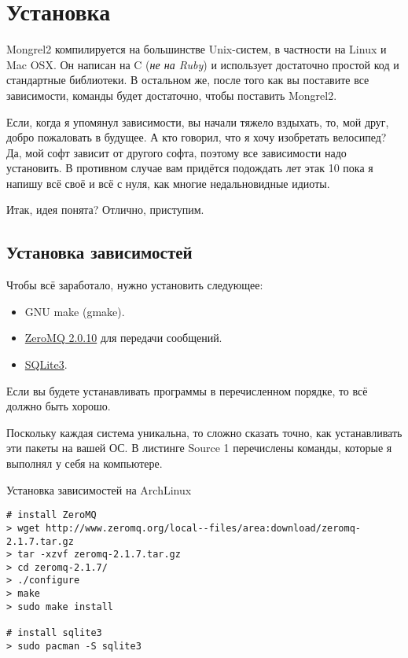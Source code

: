 \chapter{Установка}

Mongrel2 компилируется на большинстве Unix-систем, в частности на Linux и Mac OSX.
Он написан на C (\emph{не на Ruby}) и использует достаточно простой код и стандартные
библиотеки. В остальном же, после того как вы поставите все зависимости,
команды  будет достаточно, чтобы поставить Mongrel2.

Если, когда я упомянул зависимости, вы начали тяжело вздыхать, то, мой друг,
добро пожаловать в будущее. А кто говорил, что я хочу изобретать велосипед?
Да, мой софт зависит от другого софта, поэтому все зависимости надо установить.
В противном случае вам придётся подождать лет этак 10 пока я напишу всё своё
и всё с нуля, как многие недальновидные идиоты.

Итак, идея понята? Отлично, приступим.

\section{Установка зависимостей}

Чтобы всё заработало, нужно установить следующее:

\begin{itemize}
\item GNU make (gmake).
\item \href{http://zeromq.org}{ZeroMQ 2.0.10} для передачи сообщений.
\item \href{http://www.sqlite.org/}{SQLite3}.
\end{itemize}

Если вы будете устанавливать программы в перечисленном порядке, то всё должно быть хорошо.

Поскольку каждая система уникальна, то сложно сказать точно, как устанавливать
эти пакеты на вашей ОС. В листинге Source 1 перечислены команды, которые я
выполнял у себя на компьютере.

\begin{code}{Установка зависимостей на ArchLinux}
\begin{lstlisting}
# install ZeroMQ
> wget http://www.zeromq.org/local--files/area:download/zeromq-2.1.7.tar.gz
> tar -xzvf zeromq-2.1.7.tar.gz
> cd zeromq-2.1.7/
> ./configure
> make
> sudo make install

# install sqlite3
> sudo pacman -S sqlite3
\end{lstlisting}
\end{code}

